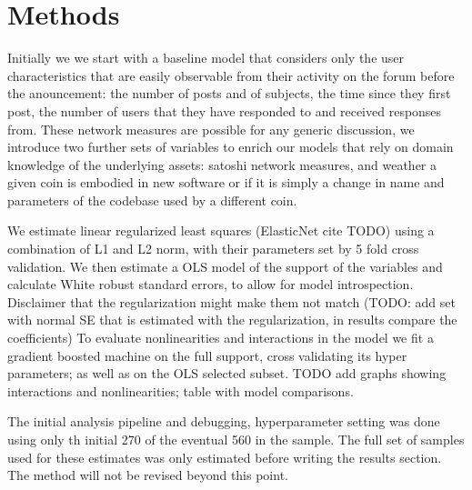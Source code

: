 
\section{Methods }

Initially we we start with a baseline model that considers only the user characteristics that are easily observable from their activity on the forum before the anouncement: the number of posts and of subjects,  the time since they first post, the number of users that they have responded to and received responses from. 
These network measures are possible for any generic discussion, we introduce two further sets of variables to enrich our models that rely on domain knowledge of the underlying assets: satoshi network measures, and weather a given coin is embodied in new software or if it is simply a change in name and parameters of the codebase used by a different coin.

We estimate linear regularized least squares (ElasticNet cite TODO) using a combination of L1 and L2 norm, with their parameters set by 5 fold cross validation. 
We then estimate a OLS model of the support of the variables and calculate White robust standard errors, to allow for model introspection. 
Disclaimer that the regularization might make them not match (TODO: add set with normal SE that is estimated with the regularization, in results compare the coefficients) 
To evaluate nonlinearities and interactions  in the model we fit a gradient boosted machine on the full support, cross validating its hyper parameters; as well as on the OLS selected subset.  TODO add graphs showing interactions and nonlinearities; table with model comparisons.


The initial analysis pipeline and debugging, hyperparameter setting was done using only th initial 270 of the eventual 560 in the sample. The full set of samples used for these estimates was only estimated before writing the results section. The method will not be revised beyond this point.

